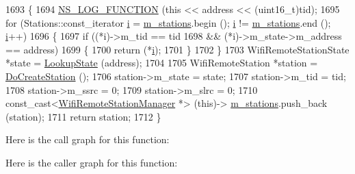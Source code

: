 \begin{DoxyCode}
1693 \{
1694   \hyperlink{log-macros-disabled_8h_a90b90d5bad1f39cb1b64923ea94c0761}{NS\_LOG\_FUNCTION} (\textcolor{keyword}{this} << address << (uint16\_t)tid);
1695   \textcolor{keywordflow}{for} (Stations::const\_iterator \hyperlink{bernuolliDistribution_8m_a6f6ccfcf58b31cb6412107d9d5281426}{i} = \hyperlink{classns3_1_1WifiRemoteStationManager_abe6711bcc48ef1c5a3f4c9949137080d}{m\_stations}.begin (); \hyperlink{bernuolliDistribution_8m_a6f6ccfcf58b31cb6412107d9d5281426}{i} != 
      \hyperlink{classns3_1_1WifiRemoteStationManager_abe6711bcc48ef1c5a3f4c9949137080d}{m\_stations}.end (); \hyperlink{bernuolliDistribution_8m_a6f6ccfcf58b31cb6412107d9d5281426}{i}++)
1696     \{
1697       \textcolor{keywordflow}{if} ((*i)->m\_tid == tid
1698           && (*i)->m\_state->m\_address == address)
1699         \{
1700           \textcolor{keywordflow}{return} (*\hyperlink{bernuolliDistribution_8m_a6f6ccfcf58b31cb6412107d9d5281426}{i});
1701         \}
1702     \}
1703   WifiRemoteStationState *state = \hyperlink{classns3_1_1WifiRemoteStationManager_aa92633f587338f32789e9210c82c6815}{LookupState} (address);
1704 
1705   WifiRemoteStation *station = \hyperlink{classns3_1_1WifiRemoteStationManager_a63dfc98d85d14b9e6b6314c7648c6a7d}{DoCreateStation} ();
1706   station->m\_state = state;
1707   station->m\_tid = tid;
1708   station->m\_ssrc = 0;
1709   station->m\_slrc = 0;
1710   \textcolor{keyword}{const\_cast<}\hyperlink{classns3_1_1WifiRemoteStationManager_a78524840f5900e1937e8e2d6df48954d}{WifiRemoteStationManager} *\textcolor{keyword}{>} (\textcolor{keyword}{this})->
      \hyperlink{classns3_1_1WifiRemoteStationManager_abe6711bcc48ef1c5a3f4c9949137080d}{m\_stations}.push\_back (station);
1711   \textcolor{keywordflow}{return} station;
1712 \}
\end{DoxyCode}


Here is the call graph for this function\+:




Here is the caller graph for this function\+:


